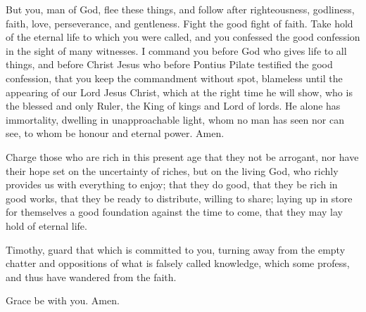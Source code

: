  But you, man of God, flee these things, and follow after
righteousness, godliness, faith, love, perseverance, and gentleness.
 Fight the good fight of faith. Take hold of the eternal
life to which you were called, and you confessed the good confession in
the sight of many witnesses.  I command you before God
who gives life to all things, and before Christ Jesus who before Pontius
Pilate testified the good confession,  that you keep the
commandment without spot, blameless until the appearing of our Lord
Jesus Christ,  which at the right time he will show, who
is the blessed and only Ruler, the King of kings and Lord of lords.
 He alone has immortality, dwelling in unapproachable
light, whom no man has seen nor can see, to whom be honour and eternal
power. Amen.

 Charge those who are rich in this present age that they
not be arrogant, nor have their hope set on the uncertainty of riches,
but on the living God, who richly provides us with everything to enjoy;
 that they do good, that they be rich in good works, that
they be ready to distribute, willing to share;  laying up
in store for themselves a good foundation against the time to come, that
they may lay hold of eternal life.

 Timothy, guard that which is committed to you, turning
away from the empty chatter and oppositions of what is falsely called
knowledge,  which some profess, and thus have wandered
from the faith.

Grace be with you. Amen.
